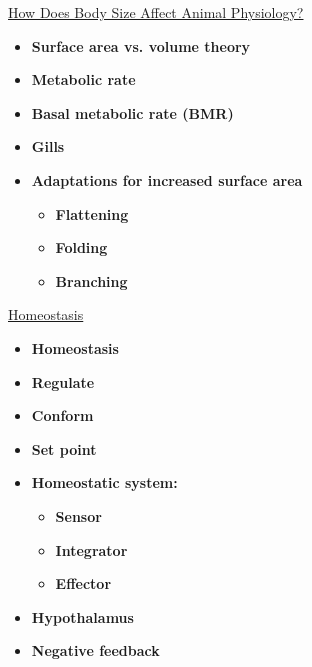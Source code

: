 \documentclass[12pt,letterpaper]{article}
\begin{document}
\hypertarget{39.3}{}
\begin{secbox}{\hyperlink{39}{How Does Body Size Affect Animal Physiology?}}{
    \begin{itemize}
        \item \textbf{Surface area vs. volume theory}
        \item \textbf{Metabolic rate}
        \item \textbf{Basal metabolic rate (BMR)}
        \item \textbf{Gills}
        \item \textbf{Adaptations for increased surface area}
        \begin{itemize}
            \item \textbf{Flattening}
            \item \textbf{Folding}
            \item \textbf{Branching}
        \end{itemize}
    \end{itemize}
}\end{secbox}

\hypertarget{39.4}{}
\begin{secbox}{\hyperlink{39}{Homeostasis}}{
    \begin{itemize}
        \item \textbf{Homeostasis}
        \item \textbf{Regulate}
        \item \textbf{Conform}
        \item \textbf{Set point}
        \item \textbf{Homeostatic system:}
        \begin{itemize}
            \item \textbf{Sensor }
            \item \textbf{Integrator}
            \item \textbf{Effector}
        \end{itemize}
        \item \textbf{Hypothalamus}
        \item \textbf{Negative feedback }
    \end{itemize}
}\end{secbox}
\end{document}
